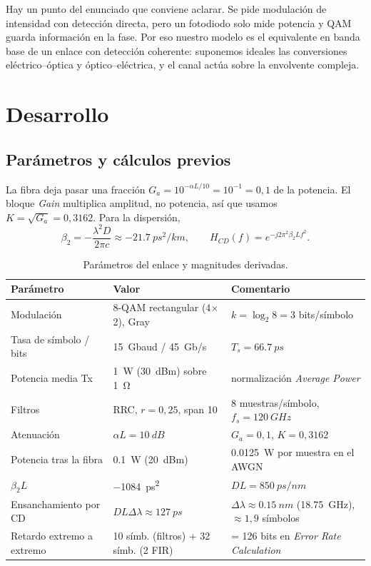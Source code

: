 \documentclass[10pt,a4paper]{article}
\begin{document}
Hay un punto del enunciado que conviene aclarar. Se pide modulación de intensidad con detección directa, pero un fotodiodo solo mide potencia y QAM guarda información en la fase. Por eso nuestro modelo es el equivalente en banda base de un enlace con detección coherente: suponemos ideales las conversiones eléctrico--óptica y óptico--eléctrica, y el canal actúa sobre la envolvente compleja.

\section{Desarrollo}
\subsection{Parámetros y cálculos previos}
La fibra deja pasar una fracción $G_a=10^{-\alpha L/10}=10^{-1}=0{,}1$ de la potencia. El bloque \textit{Gain} multiplica amplitud, no potencia, así que usamos $K=\sqrt{G_a}=0{,}3162$. Para la dispersión,
\begin{equation}
\beta_2=-\frac{\lambda^2 D}{2\pi c}\approx\SI{-21.7}{ps^2/km},\qquad H_{CD}(f)=e^{-j2\pi^2\beta_2 L f^2}.
\end{equation}

\begin{table}[H]\centering\small
\caption{Parámetros del enlace y magnitudes derivadas.}
\begin{tabular}{lll}\toprule
Parámetro & Valor & Comentario\\\midrule
Modulación & 8-QAM rectangular (4$\times$2), Gray & $k=\log_2 8=3$ bits/símbolo\\
Tasa de símbolo / bits & \SI{15}{Gbaud} / \SI{45}{Gb/s} & $T_s=\SI{66.7}{ps}$\\
Potencia media Tx & \SI{1}{W} (\SI{30}{dBm}) sobre \SI{1}{\ohm} & normalización \textit{Average Power}\\
Filtros & RRC, $r=0{,}25$, span 10 & 8 muestras/símbolo, $f_s=\SI{120}{GHz}$\\
Atenuación & $\alpha L=\SI{10}{dB}$ & $G_a=0{,}1$, $K=0{,}3162$\\
Potencia tras la fibra & \SI{0.1}{W} (\SI{20}{dBm}) & \SI{0.0125}{W} por muestra en el AWGN\\
$\beta_2L$ & \SI{-1084}{ps^2} & $DL=\SI{850}{ps/nm}$\\
Ensanchamiento por CD & $DL\Delta\lambda\approx\SI{127}{ps}$ & $\Delta\lambda\approx\SI{0.15}{nm}$ (\SI{18.75}{GHz}), $\approx1{,}9$ símbolos\\
Retardo extremo a extremo & 10 símb. (filtros) + 32 símb. (2 FIR) & = 126 bits en \textit{Error Rate Calculation}\\\bottomrule
\end{tabular}\end{table}
\end{document}
